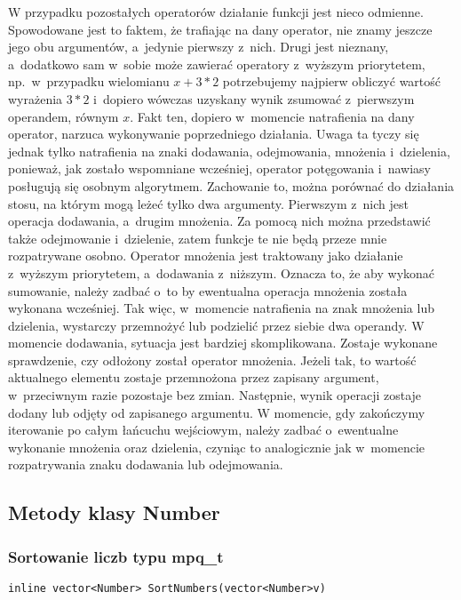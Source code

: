 W przypadku pozostałych operatorów działanie funkcji jest nieco odmienne. Spowodowane jest to faktem, że trafiając na dany operator, nie znamy jeszcze jego obu argumentów, a~jedynie pierwszy z~nich. Drugi jest nieznany, a~dodatkowo sam w~sobie może zawierać operatory z~wyższym priorytetem, np.\ w~przypadku wielomianu $x+3*2$ potrzebujemy najpierw obliczyć wartość wyrażenia $3*2$ i~dopiero wówczas uzyskany wynik zsumować z~pierwszym operandem, równym $x$. Fakt ten, dopiero w~momencie natrafienia na dany operator, narzuca wykonywanie poprzedniego działania. Uwaga ta tyczy się jednak tylko natrafienia na znaki dodawania, odejmowania, mnożenia i~dzielenia, ponieważ, jak zostało wspomniane wcześniej, operator potęgowania i~nawiasy posługują się osobnym algorytmem. Zachowanie to, można porównać do działania stosu, na którym mogą leżeć tylko dwa argumenty. Pierwszym z~nich jest operacja dodawania, a~drugim mnożenia. Za pomocą nich można przedstawić także odejmowanie i~dzielenie, zatem funkcje te nie będą przeze mnie rozpatrywane osobno. Operator mnożenia jest traktowany jako działanie z~wyższym priorytetem, a~dodawania z~niższym. Oznacza to, że aby wykonać sumowanie, należy zadbać o~to by ewentualna operacja mnożenia została wykonana wcześniej. Tak więc, w~momencie natrafienia na znak mnożenia lub dzielenia, wystarczy przemnożyć lub podzielić przez siebie dwa operandy. W momencie dodawania, sytuacja jest bardziej skomplikowana. Zostaje wykonane sprawdzenie, czy odłożony został operator mnożenia. Jeżeli tak, to wartość aktualnego elementu zostaje przemnożona przez zapisany argument, w~przeciwnym razie pozostaje bez zmian. Następnie, wynik operacji zostaje dodany lub odjęty od zapisanego argumentu. W momencie, gdy zakończymy iterowanie po całym łańcuchu wejściowym, należy zadbać o~ewentualne wykonanie mnożenia oraz dzielenia, czyniąc to analogicznie jak w~momencie rozpatrywania znaku dodawania lub odejmowania.

\subsection{Metody klasy Number}

\subsubsection{Sortowanie liczb typu mpq\_t}
\begin{lstlisting}
inline vector<Number> SortNumbers(vector<Number>v)
\end{lstlisting}

